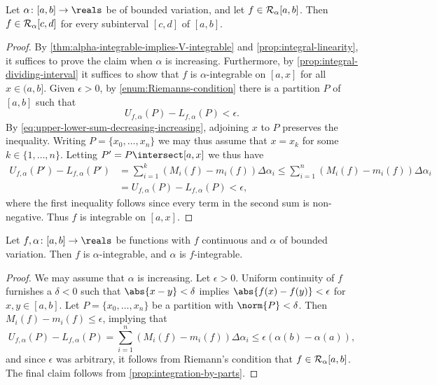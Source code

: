 \documentclass[article, a4paper, 11pt, oneside]{memoir}
\numberwithin{equation}{chapter}
\begin{document}
\begin{corollary}
    \label{cor:integrable-on-subinterval}
    Let $\alpha \colon [a,b] \to \reals$ be of bounded variation, and let $f \in \integrable[\alpha]{a,b}$. Then $f \in \integrable[\alpha]{c,d}$ for every subinterval $[c,d]$ of $[a,b]$.
\end{corollary}

\begin{proof}
    By \cref{thm:alpha-integrable-implies-V-integrable} and \cref{prop:integral-linearity}, it suffices to prove the claim when $\alpha$ is increasing. Furthermore, by \cref{prop:integral-dividing-interval} it suffices to show that $f$ is $\alpha$-integrable on $[a,x]$ for all $x \in (a,b]$. Given $\epsilon > 0$, by \cref{enum:Riemanns-condition} there is a partition $P$ of $[a,b]$ such that
    \begin{equation*}
        U_{f,\alpha}(P) - L_{f,\alpha}(P) < \epsilon.
    \end{equation*}
    By \cref{eq:upper-lower-sum-decreasing-increasing}, adjoining $x$ to $P$ preserves the inequality. Writing $P = \{x_0, \ldots, x_n\}$ we may thus assume that $x = x_k$ for some $k \in \{1, \ldots, n\}$. Letting $P' = P \intersect [a,x]$ we thus have
    \begin{align*}
        U_{f,\alpha}(P') - L_{f,\alpha}(P')
            &= \sum_{i=1}^k (M_i(f) - m_i(f)) \Delta\alpha_i
             \leq \sum_{i=1}^n (M_i(f) - m_i(f)) \Delta\alpha_i \\
            &= U_{f,\alpha}(P) - L_{f,\alpha}(P)
             < \epsilon,
    \end{align*}
    where the first inequality follows since every term in the second sum is non-negative. Thus $f$ is integrable on $[a,x]$.
\end{proof}


\begin{proposition}
    Let $f,\alpha \colon [a,b] \to \reals$ be functions with $f$ continuous and $\alpha$ of bounded variation. Then $f$ is $\alpha$-integrable, and $\alpha$ is $f$-integrable.
\end{proposition}

\begin{proof}
    We may assume that $\alpha$ is increasing. Let $\epsilon > 0$. Uniform continuity of $f$ furnishes a $\delta < 0$ such that $\abs{x-y} < \delta$ implies $\abs{f(x)-f(y)} < \epsilon$ for $x,y \in [a,b]$. Let $P = \{x_0,\ldots,x_n\}$ be a partition with $\norm{P} < \delta$. Then $M_i(f) - m_i(f) \leq \epsilon$, implying that
    \begin{equation*}
        U_{f,\alpha}(P) - L_{f,\alpha}(P)
            = \sum_{i=1}^n (M_i(f) - m_i(f)) \Delta\alpha_i
            \leq \epsilon (\alpha(b) - \alpha(a)),
    \end{equation*}
    and since $\epsilon$ was arbitrary, it follows from Riemann's condition that $f \in \integrable[\alpha]{a,b}$. The final claim follows from \cref{prop:integration-by-parts}.
\end{proof}
\end{document}
